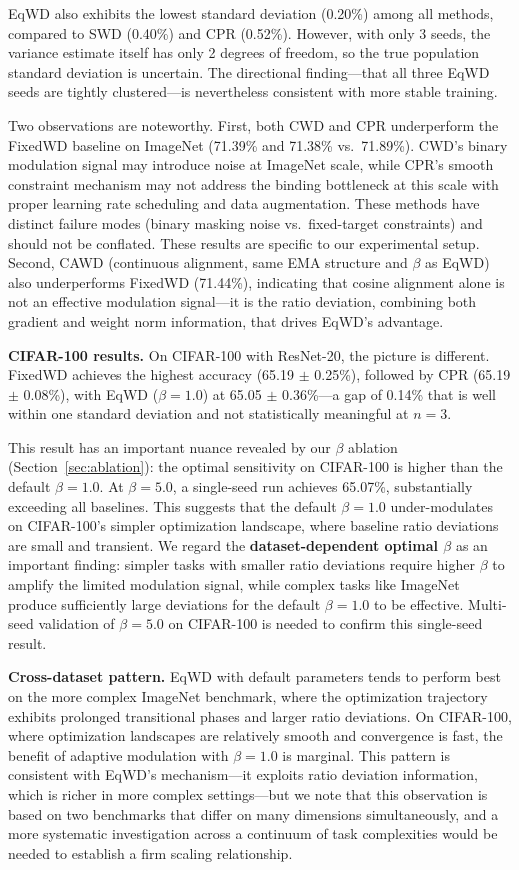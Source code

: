 \documentclass{article}
\begin{document}
EqWD also exhibits the lowest standard deviation (0.20\%) among all
methods, compared to SWD (0.40\%) and CPR (0.52\%). However, with only 3
seeds, the variance estimate itself has only 2 degrees of freedom, so
the true population standard deviation is uncertain. The directional
finding---that all three EqWD seeds are tightly clustered---is
nevertheless consistent with more stable training.

Two observations are noteworthy. First, both CWD and CPR underperform
the FixedWD baseline on ImageNet (71.39\% and 71.38\% vs.~71.89\%).
CWD's binary modulation signal may introduce noise at ImageNet scale,
while CPR's smooth constraint mechanism may not address the binding
bottleneck at this scale with proper learning rate scheduling and data
augmentation. These methods have distinct failure modes (binary masking
noise vs.~fixed-target constraints) and should not be conflated. These
results are specific to our experimental setup. Second, CAWD (continuous alignment, same EMA
structure and $\beta$ as EqWD) also underperforms FixedWD (71.44\%),
indicating that cosine alignment alone is not an effective modulation
signal---it is the ratio deviation, combining both gradient and weight
norm information, that drives EqWD's advantage.

\textbf{CIFAR-100 results.} On CIFAR-100 with ResNet-20, the picture is
different. FixedWD achieves the highest accuracy (65.19 $\pm$ 0.25\%),
followed by CPR (65.19 $\pm$ 0.08\%), with EqWD ($\beta = 1.0$) at
65.05 $\pm$ 0.36\%---a gap of 0.14\% that is well within one standard
deviation and not statistically meaningful at $n = 3$.

This result has an important nuance revealed by our $\beta$ ablation
(Section~\ref{sec:ablation}): the optimal sensitivity on CIFAR-100 is higher than the
default $\beta = 1.0$. At $\beta = 5.0$, a single-seed run achieves
65.07\%, substantially exceeding all baselines. This suggests that the
default $\beta = 1.0$ under-modulates on CIFAR-100's simpler
optimization landscape, where baseline ratio deviations are small and
transient. We regard the \textbf{dataset-dependent optimal $\beta$} as
an important finding: simpler tasks with smaller ratio deviations
require higher $\beta$ to amplify the limited modulation signal, while
complex tasks like ImageNet produce sufficiently large deviations for
the default $\beta = 1.0$ to be effective. Multi-seed validation of
$\beta = 5.0$ on CIFAR-100 is needed to confirm this single-seed
result.

\textbf{Cross-dataset pattern.} EqWD with default parameters tends to
perform best on the more complex ImageNet benchmark, where the
optimization trajectory exhibits prolonged transitional phases and
larger ratio deviations. On CIFAR-100, where optimization landscapes are
relatively smooth and convergence is fast, the benefit of adaptive
modulation with $\beta = 1.0$ is marginal. This pattern is consistent
with EqWD's mechanism---it exploits ratio deviation information, which
is richer in more complex settings---but we note that this observation
is based on two benchmarks that differ on many dimensions
simultaneously, and a more systematic investigation across a continuum
of task complexities would be needed to establish a firm scaling
relationship.
\end{document}
